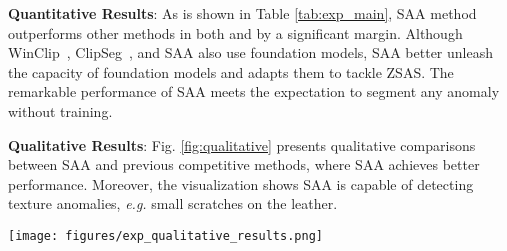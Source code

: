 \documentclass{article}
\begin{document}
\noindent\textbf{Quantitative Results}: As is shown in Table \ref{tab:exp_main}, SAA method outperforms other methods in both  and  by a significant margin. Although WinClip~\cite{jeong2023winclip}, ClipSeg~\cite{clipseg2022}, and SAA also use foundation models, SAA better unleash the capacity of foundation models and adapts them to tackle ZSAS. The remarkable performance of SAA meets the expectation to segment any anomaly without training.

\noindent\textbf{Qualitative Results}: Fig. \ref{fig:qualitative} presents qualitative comparisons between  SAA and previous competitive methods, where SAA achieves better performance. Moreover, the visualization shows SAA is capable of detecting texture anomalies, \textit{e.g.} small scratches on the leather. 

\begin{figure*}[t]
\vspace{-2mm}
    \centering
        \texttt{[image: figures/exp\_qualitative\_results.png]}
\vspace{-4mm}\caption{Qualitative comparisons on zero-shot anomaly segmentation  for ClipSeg~\cite{clipseg2022}, UTAD~\cite{aota2023zero}, SAA, and SAA on four datasets, \textit{i.e.}, VisA~\cite{zou2022spot}, MVTec-AD~\cite{bergmann2019mvtec}, KSDD2~\cite{bozic_mixed_2021}, and MTD~\cite{mtd2018}}
    \label{fig:qualitative}
\end{figure*}
\end{document}
